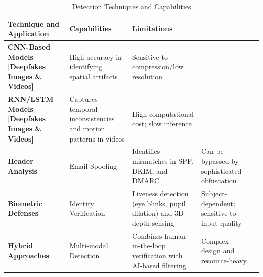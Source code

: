 \documentclass[12pt,a4paper]{article}
\begin{document}
\begin{table}[H]
\caption{Detection Techniques and Capabilities}
\label{tab:inclusion-exclusion}

\fontsize{10pt}{12pt}\selectfont
\begin{tabularx}{\textwidth}{|p{3cm}|X|X|X|X|}
\hline
\centering\textbf{Technique and Application} &
\centering\textbf{Capabilities} & 
\centering\textbf{Limitations}
\tabularnewline
\hline

\centering \textbf{CNN-Based Models [Deepfakes Images \& Videos]} &
\centering High accuracy in identifying spatial artifacts \cite{SINGH2025103632} & 
\centering Sensitive to compression/low resolution
\tabularnewline
\hline

\centering \textbf{RNN/LSTM Models [Deepfakes Images \& Videos]} &
\centering Captures temporal inconsistencies and motion patterns in videos \cite{SINGH2025103632} & 
\centering High computational cost; slow inference
\tabularnewline
\hline

\centering \textbf{Header Analysis} &
\centering Email Spoofing &
\centering Identifies mismatches in SPF, DKIM, and DMARC \cite{11480014} & 
\centering Can be bypassed by sophisticated obfuscation
\tabularnewline
\hline

\centering \textbf{Biometric Defenses} &
\centering Identity Verification &
\centering Liveness detection (eye blinks, pupil dilation) and 3D depth sensing \cite{SINGH2025103632} & 
\centering Subject-dependent; sensitive to input quality
\tabularnewline
\hline

\centering \textbf{Hybrid Approaches}&
\centering Multi-modal Detection &
\centering Combines human-in-the-loop verification with AI-based filtering \cite{11480014} & 
\centering Complex design and resource-heavy
\tabularnewline
\hline

\end{tabularx}
\end{table}
\end{document}
